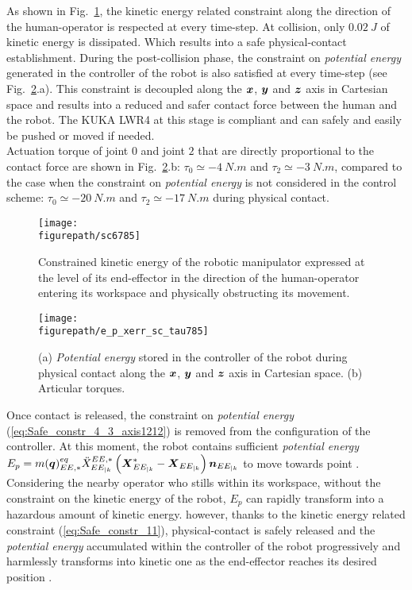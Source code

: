 As shown in Fig.~\ref{fig:sc6785}, the kinetic energy related constraint along the direction of the human-operator is respected at every time-step. At collision, only $0.02~J$ of kinetic energy is dissipated. Which results into a safe physical-contact establishment. During the post-collision phase, the constraint on \textit{potential energy} generated in the controller of the robot is also satisfied at every time-step (see Fig.~\ref{fig:e_p_xerr_sc_tau785}.a). This constraint is decoupled along the $\mbox{\boldmath${x}$}$, $\mbox{\boldmath${y}$}$ and $\mbox{\boldmath${z}$}$ axis in Cartesian space and results into a reduced and safer contact force between the human and the robot. The KUKA LWR4 at this stage is compliant and can safely and easily be pushed or moved if needed. \\
Actuation torque of joint $0$ and joint $2$ that are directly proportional to the contact force are shown in Fig.~\ref{fig:e_p_xerr_sc_tau785}.b: $\tau_0 \simeq -4~N.m$ and $\tau_2 \simeq -3~N.m$, compared to the case when the constraint on \textit{potential energy} is not considered in the control scheme: $\tau_0 \simeq -20~N.m$ and $\tau_2 \simeq -17~N.m$ during physical contact. \\
\begin{figure}[!ht]
\centering
\captionsetup{width=0.99\linewidth}\texttt{[image: \\figurepath/sc6785]}
\caption{Constrained kinetic energy of the robotic manipulator expressed at the level of its end-effector in the direction of the human-operator entering its workspace and physically obstructing its movement.}
\label{fig:sc6785}
\end{figure}
\begin{figure}[!ht]
\centering
\captionsetup{width=0.99\linewidth}\texttt{[image: \\figurepath/e\_p\_xerr\_sc\_tau785]}
\caption{(a) \textit{Potential energy} stored in the controller of the robot during physical contact along the $\mbox{\boldmath${x}$}$, $\mbox{\boldmath${y}$}$ and $\mbox{\boldmath${z}$}$ axis in Cartesian space. (b) Articular torques.}
\label{fig:e_p_xerr_sc_tau785}
\end{figure}
Once contact is released, the constraint on \textit{potential energy} (\ref{eq:Safe_constr_4_3_axis1212}) is removed from the  configuration of the controller. At this moment, the robot contains sufficient \textit{potential energy} $E_{p} = m(\mbox{\boldmath${q}$})_{EE,*}^{eq} \ddot{X}_{EE_{|k}}^{EE,*} \left(\mbox{\boldmath${X}$}_{EE_{|k}}^{*} - \mbox{\boldmath${X}$}_{EE_{|k}}\right) \mbox{\boldmath${n}$}_{EE_{|k}}$ to move towards point . Considering the nearby operator who stills within its workspace, without the constraint on the kinetic energy of the robot, $E_{p}$ can rapidly transform into a hazardous amount of kinetic energy. however, thanks to the kinetic energy related constraint (\ref{eq:Safe_constr_11}), physical-contact is safely released and the \textit{potential energy} accumulated within the controller of the robot progressively and harmlessly transforms into kinetic one as the end-effector reaches its desired position .




